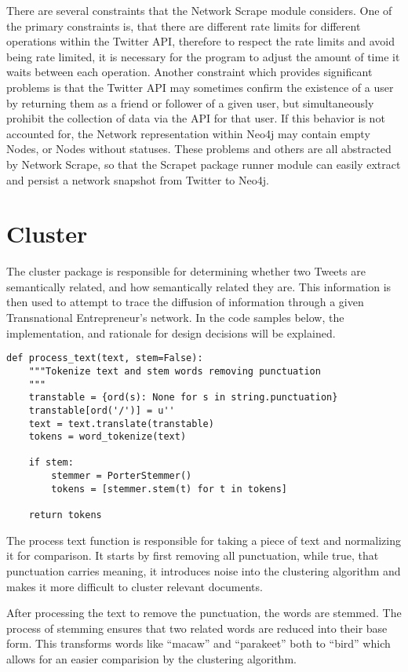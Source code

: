 There are several constraints that the Network Scrape module
considers. One of the primary constraints is, that there are different
rate limits for different operations within the Twitter API, therefore
to respect the rate limits and avoid being rate limited, it is
necessary for the program to adjust the amount of time it waits
between each operation. Another constraint which provides significant
problems is that the Twitter API may sometimes confirm the existence
of a user by returning them as a friend or follower of a given user,
but simultaneously prohibit the collection of data via the API for
that user. If this behavior is not accounted for, the Network
representation within Neo4j may contain empty Nodes, or Nodes without
statuses. These problems and others are all abstracted by Network
Scrape, so that the Scrapet package runner module can easily extract
and persist a network snapshot from Twitter to Neo4j.

\section{Cluster}
The cluster package is responsible for determining whether two Tweets
are semantically related, and how semantically related they are. This
information is then used to attempt to trace the diffusion of
information through a given Transnational Entrepreneur's network. In
the code samples below, the implementation, and rationale for design
decisions will be explained.

\begin{lstlisting}
def process_text(text, stem=False):
    """Tokenize text and stem words removing punctuation
    """
    transtable = {ord(s): None for s in string.punctuation}
    transtable[ord('/')] = u''
    text = text.translate(transtable)
    tokens = word_tokenize(text)
    
    if stem:
        stemmer = PorterStemmer()
        tokens = [stemmer.stem(t) for t in tokens]
    
    return tokens
\end{lstlisting}

The process text function is responsible for taking a piece of text
and normalizing it for comparison. It starts by first removing all
punctuation, while true, that punctuation carries meaning, it
introduces noise into the clustering algorithm and makes it more
difficult to cluster relevant documents.

After processing the text to remove the punctuation, the words are
stemmed. The process of stemming ensures that two related words are
reduced into their base form. This transforms words like ``macaw'' and
``parakeet'' both to ``bird'' which allows for an easier comparision
by the clustering algorithm.

